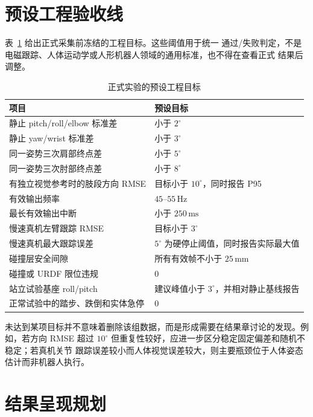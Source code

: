 \section{预设工程验收线}
\label{sec:ch6_acceptance_thresholds}

表~\ref{tab:ch6_acceptance_thresholds} 给出正式采集前冻结的工程目标。这些阈值用于统一
通过/失败判定，不是电磁跟踪、人体运动学或人形机器人领域的通用标准，也不得在查看正式
结果后调整。
\begin{table}[htbp]
  \centering
  \caption{正式实验的预设工程目标}
  \label{tab:ch6_acceptance_thresholds}
  \begin{tabularx}{\linewidth}{@{}XX@{}}
    \toprule
    项目 & 预设目标 \\
    \midrule
    静止 pitch/roll/elbow 标准差 & 小于 $2^\circ$ \\
    静止 yaw/wrist 标准差 & 小于 $3^\circ$ \\
    同一姿势三次肩部终点差 & 小于 $5^\circ$ \\
    同一姿势三次肘部终点差 & 小于 $8^\circ$ \\
    有独立视觉参考时的肢段方向 RMSE & 目标小于 $10^\circ$，同时报告 P95 \\
    有效输出频率 & $45$--$55\,\mathrm{Hz}$ \\
    最长有效输出中断 & 小于 $250\,\mathrm{ms}$ \\
    慢速真机左臂跟踪 RMSE & 目标小于 $3^\circ$ \\
    慢速真机最大跟踪误差 & $5^\circ$ 为硬停止阈值，同时报告实际最大值 \\
    碰撞层安全间隙 & 所有有效帧不小于 $25\,\mathrm{mm}$ \\
    碰撞或 URDF 限位违规 & 0 \\
    站立试验基座 roll/pitch & 建议峰值小于 $3^\circ$，并相对静止基线报告 \\
    正常试验中的踏步、跌倒和实体急停 & 0 \\
    \bottomrule
  \end{tabularx}
\end{table}

未达到某项目标并不意味着删除该组数据，而是形成需要在结果章讨论的发现。例如，若方向
RMSE 超过 $10^\circ$ 但重复性较好，应进一步区分稳定固定偏差和随机不稳定；若真机关节
跟踪误差较小而人体视觉误差较大，则主要瓶颈位于人体姿态估计而非机器人执行。

\section{结果呈现规划}
\label{sec:ch6_result_presentation_plan}

